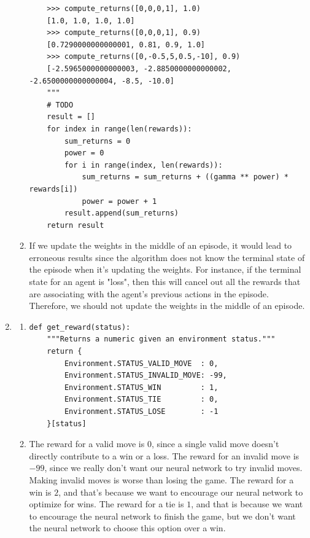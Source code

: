 \documentclass[10pt,letterpaper]{article}
\begin{document}
\begin{enumerate}
\begin{enumerate}
\begin{lstlisting}
    >>> compute_returns([0,0,0,1], 1.0)
    [1.0, 1.0, 1.0, 1.0]
    >>> compute_returns([0,0,0,1], 0.9)
    [0.7290000000000001, 0.81, 0.9, 1.0]
    >>> compute_returns([0,-0.5,5,0.5,-10], 0.9)
    [-2.5965000000000003, -2.8850000000000002, -2.6500000000000004, -8.5, -10.0]
    """
    # TODO
    result = []
    for index in range(len(rewards)):
        sum_returns = 0
        power = 0
        for i in range(index, len(rewards)):
            sum_returns = sum_returns + ((gamma ** power) * rewards[i])
            power = power + 1
        result.append(sum_returns)
    return result
			\end{lstlisting}
			\item %
			If we update the weights in the middle of an episode, it would lead to erroneous results since the algorithm does not know the terminal state of the episode when it's updating the weights. For instance, if the terminal state for an agent is "loss", then this will cancel out all the rewards that are associating with the agent's previous actions in the episode. Therefore, we should not update the weights in the middle of an episode.
		\end{enumerate}
		\item %
		\begin{enumerate}
			\item %
			\begin{lstlisting}
def get_reward(status):
    """Returns a numeric given an environment status."""
    return {
        Environment.STATUS_VALID_MOVE  : 0,
        Environment.STATUS_INVALID_MOVE: -99,
        Environment.STATUS_WIN         : 1,
        Environment.STATUS_TIE         : 0,
        Environment.STATUS_LOSE        : -1
    }[status]
			\end{lstlisting}
			\item %
			The reward for a valid move is $0$, since a single valid move doesn't directly contribute to a win or a loss.
			The reward for an invalid move is $-99$, since we really don't want our neural network to try invalid moves.
			Making invalid moves is worse than losing the game.
			The reward for a win is $2$, and that's because we want to encourage our neural network to optimize for wins.
			The reward for a tie is $1$, and that is because we want to encourage the neural network to finish the game, but we don't want the neural network to choose this option over a win.

\end{enumerate}
\end{enumerate}
\end{document}
